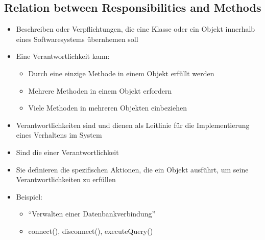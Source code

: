 \subsection{Relation between Responsibilities and Methods}
\begin{infoBox}[title=Verantwortlichkeiten]
    \begin{itemize}
        \item Beschreiben  oder Verpflichtungen, die eine Klasse oder ein Objekt innerhalb eines Softwaresystems übernhemen soll
        \item Eine Verantwortlichkeit kann:
        \begin{itemize}
            \item Durch eine einzige Methode in einem Objekt erfüllt werden
            \item Mehrere Methoden in einem Objekt erfordern
            \item Viele Methoden in mehreren Objekten einbeziehen
        \end{itemize}
        \item Verantwortlichkeiten sind  und dienen als Leitlinie für die Implementierung eines Verhaltens im System
    \end{itemize}
\end{infoBox}
\begin{infoBox}[title=Methoden]
    \begin{itemize}
        \item Sind die  einer Verantwortlichkeit
        \item Sie definieren die spezifischen Aktionen, die ein Objekt ausführt, um seine Verantwortlichkeiten zu erfüllen
        \item Beispiel:
        \begin{itemize}
            \item {} \enquote{Verwalten einer Datenbankverbindung}
            \item {} connect(), disconnect(), executeQuery()
        \end{itemize}
    \end{itemize}
\end{infoBox}
